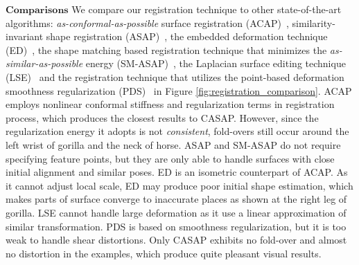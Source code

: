 $\textbf{Comparisons}$ We compare our registration technique to other state-of-the-art algorithms: \emph{as-conformal-as-possible} surface registration (ACAP)~\citep{yoshiyasu2014conformal}, similarity-invariant shape registration (ASAP)~\citep{yamazaki2013non}, the embedded deformation technique (ED)~\citep{sumner2007embedded}, the shape matching based registration technique that minimizes the \emph{as-similar-as-possible} energy (SM-ASAP)~\citep{papazov2011deformable}, the Laplacian surface editing technique (LSE)~\citep{sorkine2004laplacian} and the registration technique that utilizes the point-based deformation smoothness regularization (PDS)~\citep{amberg2007optimal} in Figure \ref{fig:registration_comparison}. ACAP employs nonlinear conformal stiffness and regularization terms in registration process, which produces the closest results to CASAP. However, since the regularization energy it adopts is not \emph{consistent}, fold-overs still occur around the left wrist of gorilla and the neck of horse. ASAP and SM-ASAP do not require specifying feature points, but they are only able to handle surfaces with close initial alignment and similar poses. ED is an isometric counterpart of ACAP. As it cannot adjust local scale, ED may produce poor initial shape estimation, which makes parts of surface converge to inaccurate places as shown at the right leg of gorilla. LSE cannot handle large deformation as it use a linear approximation of similar transformation. PDS is based on smoothness regularization, but it is too weak to handle shear distortions. Only CASAP exhibits no fold-over and almost no distortion in the examples, which produce quite pleasant visual results.
 \begin{figure}[!thpb]
 \end{figure}



